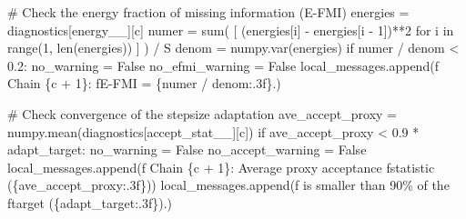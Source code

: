\documentclass[
  letterpaper,
  DIV=11,
  numbers=noendperiod]{scrartcl}
\newenvironment{Shaded}{\begin{snugshade}}{\end{snugshade}}
\newcommand{\BuiltInTok}[1]{\textcolor[rgb]{0.00,0.23,0.31}{#1}}
\newcommand{\CommentTok}[1]{\textcolor[rgb]{0.37,0.37,0.37}{#1}}
\newcommand{\ControlFlowTok}[1]{\textcolor[rgb]{0.00,0.23,0.31}{#1}}
\newcommand{\DecValTok}[1]{\textcolor[rgb]{0.68,0.00,0.00}{#1}}
\newcommand{\FloatTok}[1]{\textcolor[rgb]{0.68,0.00,0.00}{#1}}
\newcommand{\KeywordTok}[1]{\textcolor[rgb]{0.00,0.23,0.31}{#1}}
\newcommand{\NormalTok}[1]{\textcolor[rgb]{0.00,0.23,0.31}{#1}}
\newcommand{\OperatorTok}[1]{\textcolor[rgb]{0.37,0.37,0.37}{#1}}
\newcommand{\SpecialCharTok}[1]{\textcolor[rgb]{0.37,0.37,0.37}{#1}}
\newcommand{\SpecialStringTok}[1]{\textcolor[rgb]{0.13,0.47,0.30}{#1}}
\newcommand{\StringTok}[1]{\textcolor[rgb]{0.13,0.47,0.30}{#1}}
\newcommand{\VariableTok}[1]{\textcolor[rgb]{0.07,0.07,0.07}{#1}}
\begin{document}
\begin{Shaded}
\begin{Highlighting}[]
    \CommentTok{\# Check the energy fraction of missing information (E{-}FMI)}
\NormalTok{    energies }\OperatorTok{=}\NormalTok{ diagnostics[}\StringTok{\textquotesingle{}energy\_\_\textquotesingle{}}\NormalTok{][c]}
\NormalTok{    numer }\OperatorTok{=} \BuiltInTok{sum}\NormalTok{( [ (energies[i] }\OperatorTok{{-}}\NormalTok{ energies[i }\OperatorTok{{-}} \DecValTok{1}\NormalTok{])}\OperatorTok{**}\DecValTok{2} 
                   \ControlFlowTok{for}\NormalTok{ i }\KeywordTok{in} \BuiltInTok{range}\NormalTok{(}\DecValTok{1}\NormalTok{, }\BuiltInTok{len}\NormalTok{(energies)) ] ) }\OperatorTok{/}\NormalTok{ S}
\NormalTok{    denom }\OperatorTok{=}\NormalTok{ numpy.var(energies)}
    \ControlFlowTok{if}\NormalTok{ numer }\OperatorTok{/}\NormalTok{ denom }\OperatorTok{\textless{}} \FloatTok{0.2}\NormalTok{:}
\NormalTok{      no\_warning }\OperatorTok{=} \VariableTok{False}
\NormalTok{      no\_efmi\_warning }\OperatorTok{=} \VariableTok{False}
\NormalTok{      local\_messages.append(}\SpecialStringTok{f\textquotesingle{}  Chain }\SpecialCharTok{\{}\NormalTok{c }\OperatorTok{+} \DecValTok{1}\SpecialCharTok{\}}\SpecialStringTok{: \textquotesingle{}}
                            \SpecialStringTok{f\textquotesingle{}E{-}FMI = }\SpecialCharTok{\{}\NormalTok{numer }\OperatorTok{/}\NormalTok{ denom}\SpecialCharTok{:.3f\}}\SpecialStringTok{.\textquotesingle{}}\NormalTok{)}
    
    \CommentTok{\# Check convergence of the stepsize adaptation}
\NormalTok{    ave\_accept\_proxy }\OperatorTok{=}\NormalTok{ numpy.mean(diagnostics[}\StringTok{\textquotesingle{}accept\_stat\_\_\textquotesingle{}}\NormalTok{][c])}
    \ControlFlowTok{if}\NormalTok{ ave\_accept\_proxy }\OperatorTok{\textless{}} \FloatTok{0.9} \OperatorTok{*}\NormalTok{ adapt\_target:}
\NormalTok{      no\_warning }\OperatorTok{=} \VariableTok{False}
\NormalTok{      no\_accept\_warning }\OperatorTok{=} \VariableTok{False}
\NormalTok{      local\_messages.append(}\SpecialStringTok{f\textquotesingle{}  Chain }\SpecialCharTok{\{}\NormalTok{c }\OperatorTok{+} \DecValTok{1}\SpecialCharTok{\}}\SpecialStringTok{: Average proxy acceptance \textquotesingle{}}
                            \SpecialStringTok{f\textquotesingle{}statistic (}\SpecialCharTok{\{}\NormalTok{ave\_accept\_proxy}\SpecialCharTok{:.3f\}}\SpecialStringTok{)\textquotesingle{}}\NormalTok{)}
\NormalTok{      local\_messages.append(}\SpecialStringTok{f\textquotesingle{}           is smaller than 90\% of the \textquotesingle{}}
                            \SpecialStringTok{f\textquotesingle{}target (}\SpecialCharTok{\{}\NormalTok{adapt\_target}\SpecialCharTok{:.3f\}}\SpecialStringTok{).\textquotesingle{}}\NormalTok{)}
    

\end{Highlighting}
\end{Shaded}
\end{document}
